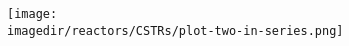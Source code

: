 \begin{frame}\frametitle{}
	\begin{center}
		\texttt{[image: \\imagedir/reactors/CSTRs/plot-two-in-series.png]}
	\end{center}
\end{frame}


% 
% 	
% 			
% 			
% 		
% 
% 
% 		
% 


% 
% 	

